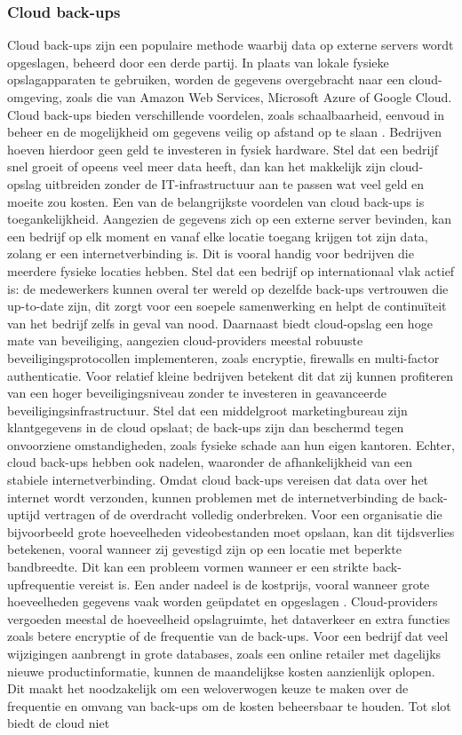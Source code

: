 \subsubsection{Cloud back-ups}
Cloud back-ups zijn een populaire methode waarbij data op externe servers wordt opgeslagen, beheerd door een derde partij. In plaats van lokale fysieke opslagapparaten te gebruiken, worden de gegevens overgebracht naar een cloud-omgeving, zoals die van Amazon Web Services, Microsoft Azure of Google Cloud. Cloud back-ups bieden verschillende voordelen, zoals schaalbaarheid, eenvoud in beheer en de mogelijkheid om gegevens veilig op afstand op te slaan \autocite{Rahumed2011}. Bedrijven hoeven hierdoor geen geld te investeren in fysiek hardware. Stel dat een bedrijf snel groeit of opeens veel meer data heeft, dan kan het makkelijk zijn cloud-opslag uitbreiden zonder de IT-infrastructuur aan te passen wat veel geld en moeite zou kosten. Een van de belangrijkste voordelen van cloud back-ups is toegankelijkheid. Aangezien de gegevens zich op een externe server bevinden, kan een bedrijf op elk moment en vanaf elke locatie toegang krijgen tot zijn data, zolang er een internetverbinding is. Dit is vooral handig voor bedrijven die meerdere fysieke locaties hebben. Stel dat een bedrijf op internationaal vlak actief is: de medewerkers kunnen overal ter wereld op dezelfde back-ups vertrouwen die up-to-date zijn, dit zorgt voor een soepele samenwerking en helpt de continuïteit van het bedrijf zelfs in geval van nood. Daarnaast biedt cloud-opslag een hoge mate van beveiliging, aangezien cloud-providers meestal robuuste beveiligingsprotocollen implementeren, zoals encryptie, firewalls en multi-factor authenticatie. Voor relatief kleine bedrijven betekent dit dat zij kunnen profiteren van een hoger beveiligingsniveau zonder te investeren in geavanceerde beveiligingsinfrastructuur. Stel dat een middelgroot marketingbureau zijn klantgegevens in de cloud opslaat; de back-ups zijn dan beschermd tegen onvoorziene omstandigheden, zoals fysieke schade aan hun eigen kantoren. Echter, cloud back-ups hebben ook nadelen, waaronder de afhankelijkheid van een stabiele internetverbinding. Omdat cloud back-ups vereisen dat data over het internet wordt verzonden, kunnen problemen met de internetverbinding de back-uptijd vertragen of de overdracht volledig onderbreken. Voor een organisatie die bijvoorbeeld grote hoeveelheden videobestanden moet opslaan, kan dit tijdsverlies betekenen, vooral wanneer zij gevestigd zijn op een locatie met beperkte bandbreedte. Dit kan een probleem vormen wanneer er een strikte back-upfrequentie vereist is. Een ander nadeel is de kostprijs, vooral wanneer grote hoeveelheden gegevens vaak worden geüpdatet en opgeslagen \autocite{Obrutsky2016}. Cloud-providers vergoeden meestal de hoeveelheid opslagruimte, het dataverkeer en extra functies zoals betere encryptie of de frequentie van de back-ups. Voor een bedrijf dat veel wijzigingen aanbrengt in grote databases, zoals een online retailer met dagelijks nieuwe productinformatie, kunnen de maandelijkse kosten aanzienlijk oplopen. Dit maakt het noodzakelijk om een weloverwogen keuze te maken over de frequentie en omvang van back-ups om de kosten beheersbaar te houden. Tot slot biedt de cloud niet 